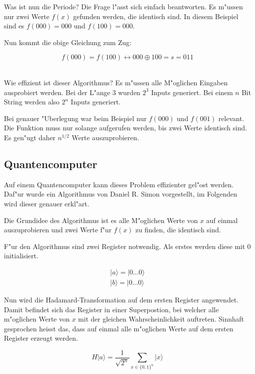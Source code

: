 \begin{refsection}
Was ist nun die Periode? Die Frage l"asst sich einfach beantworten. Es m"ussen
nur zwei Werte $f(x)$ gefunden werden, die identisch sind. In diesem Beispiel
sind es $f(000) = 000$ und $f(100) = 000$. 

Nun kommt die obige Gleichung zum Zug:

\[
    f(000) = f(100) \leftrightarrow 000 \oplus 100 = s = 011
\] \

Wie effizient ist dieser Algorithmus? Es m"ussen alle M"oglichen Eingaben
ausprobiert werden. Bei der L"ange $3$ wurden $2^3$ Inputs generiert. Bei einem
$n$ Bit String werden also $2^n$ Inputs generiert. 

Bei genauer "Uberlegung war beim Beispiel nur $f(000)$ und $f(001)$ relevant.
Die Funktion muss nur solange aufgerufen werden, bis zwei Werte identisch sind.
Es gen"ugt daher $n^{1/2}$ Werte auszuprobieren.


\subsection{Quantencomputer}

Auf einem Quantencomputer kann dieses Problem effizienter gel"ost werden.
Daf"ur wurde ein Algorithmus von Daniel R. Simon vorgestellt, im Folgenden wird
dieser genauer erkl"art.


Die Grundidee des Algorithmus ist es alle M"oglichen Werte von $x$ auf einmal
auszuprobieren und zwei Werte f"ur $f(x)$ zu finden, die identisch sind.

F"ur den Algorithmus sind zwei Register notwendig. Als erstes werden diese mit
0 initialisiert.

\begin{align*}
    |a\rangle=|0 ... 0 \rangle 
    \\
    |b\rangle=|0 ... 0 \rangle 
\end{align*}

Nun wird die Hadamard-Transformation auf dem ersten Register angewendet. Damit
befindet sich das Register in einer Superpostion, bei welcher alle m"oglichen
Werte von $x$ mit der gleichen Wahrscheinlichkeit auftreten. Sinnhaft
gesprochen heisst das, dass auf einmal alle m"oglichen Werte auf dem ersten
Register erzeugt werden.

\[ 
    H|a\rangle=\frac{1}{\sqrt{2^n}} \sum_{x\in\{0,1\}^n}{|x\rangle}
\]
 

\end{refsection}
